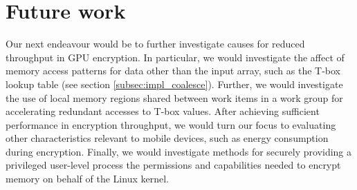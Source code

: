 \documentclass[conference,10pt]{IEEEtran}
\begin{document}
\section{Future work}

Our next endeavour would be to further investigate causes for reduced throughput in GPU encryption.  
In particular, we would investigate the affect of memory access patterns for data other than the 
input array, such as the T-box lookup table (see section \ref{subsec:impl_coalesce}).  Further, we 
would investigate the use of local memory regions shared between work items in a work group for 
accelerating redundant accesses to T-box values.  After achieving sufficient performance in 
encryption throughput, we would turn our focus to evaluating other characteristics relevant to 
mobile devices, such as energy consumption during encryption.  Finally, we would investigate methods 
for securely providing a privileged user-level process the permissions and capabilities needed to 
encrypt memory on behalf of the Linux kernel.





%
%
%
% 
% 

\end{document}
